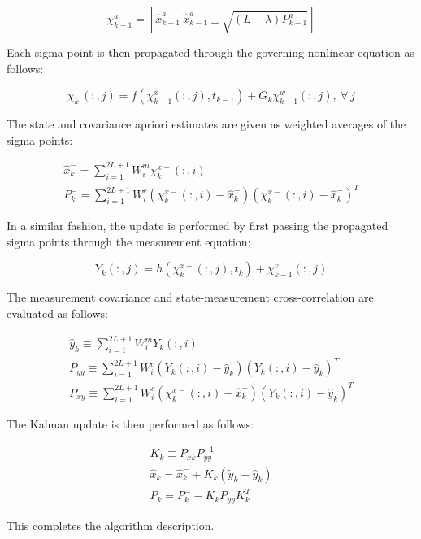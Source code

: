 \documentclass[]{article}
\begin{document}
\begin{equation}
\chi^a_{k-1} = [\hat{x}^a_{k-1} \ \hat{x}^a_{k-1}\pm \sqrt{(L+\lambda)P_{k-1}^a}]
\end{equation}

Each sigma point is then propagated through the governing nonlinear equation as follows:

\begin{equation}
\chi^-_{k}(:,j) = f(\chi^x_{k-1}(:,j),t_{k-1}) + G_k \chi^w_{k-1}(:,j), \ \forall \ j
\label{eq:ukf_prop}
\end{equation}

The state and covariance apriori estimates are given as weighted averages of the sigma points:

\begin{align}
\hat{x}_k^- = \sum_{i=1}^{2L+1} W_i^m \chi^{x-}_k(:,i) \\
P_k^- = \sum_{i=1}^{2L+1} W_i^c (\chi^{x-}_k(:,i)-\hat{x}_k^-)(\chi^{x-}_k(:,i)-\hat{x}_k^-)^T
\end{align}

In a similar fashion, the update is performed by first passing the propagated sigma points through the measurement equation:

\begin{equation}
Y_k(:,j) = h(\chi^{x-}_k(:,j),t_k) + \chi^v_{k-1}(:,j)
\label{eq:ukf_expectation}
\end{equation}

The measurement covariance and state-measurement cross-correlation are evaluated as follows:

\begin{align}
\hat{y}_k \equiv \sum_{i=1}^{2L+1} W_i^m Y_k(:,i) \\
P_{yy} \equiv \sum_{i=1}^{2L+1} W_i^c (Y_k(:,i)-\hat{y}_k)(Y_k(:,i)-\hat{y}_k)^T \\
P_{xy} \equiv \sum_{i=1}^{2L+1} W_i^c (\chi^{x-}_k(:,i)-\hat{x}_k^-)(Y_k(:,i)-\hat{y}_k)^T
\end{align}

The Kalman update is then performed as follows:

\begin{align}
K_k \equiv P_{xk} P_{yy}^{-1} \\
\hat{x}_k = \hat{x}_k^- + K_k(\tilde{y}_k - \hat{y}_k) \\
P_k = P_k^- - K_kP_{yy}K_k^T
\label{eq:ukf_end}
\end{align}

This completes the algorithm description.
\end{document}
